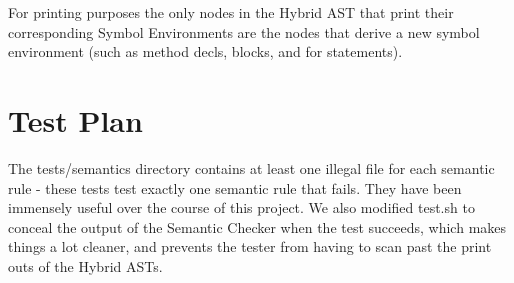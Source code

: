 \documentclass[11pt]{article}
\begin{document}
For printing purposes the only nodes in the Hybrid AST that print their 
corresponding Symbol Environments are the nodes that derive a new symbol 
environment (such as method decls, blocks, and for statements). 

\section{Test Plan}
\label{sec:test}
The tests/semantics directory contains at least one illegal file for each 
semantic rule - these tests test exactly one semantic rule that fails. They 
have been immensely useful over the course of this project. We also modified 
test.sh to conceal the output of the Semantic Checker when the test succeeds, 
which makes things a lot cleaner, and prevents the tester from having to scan 
past the print outs of the Hybrid ASTs.
\end{document}
